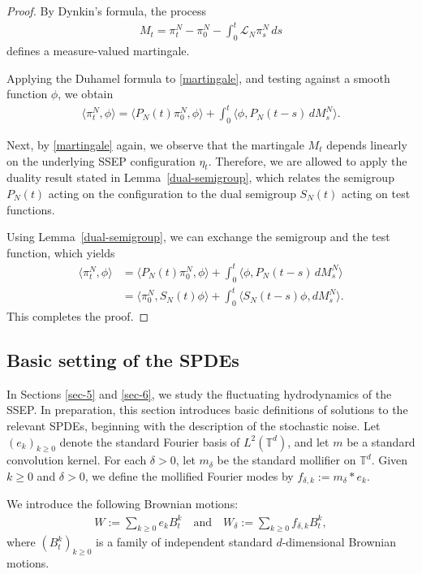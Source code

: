 \documentclass[UTF-8,reqno]{amsart}
\numberwithin{equation}{section}
\def\geq{\geqslant}
\def\geq{\geqslant}
\begin{document}
\begin{proof}
By Dynkin's formula, the process
\begin{align}\label{martingale}
M_t = \pi^N_t - \pi^N_0 - \int_0^t \mathcal{L}_N \pi^N_s \, ds
\end{align}
defines a measure-valued martingale.

Applying the Duhamel formula to \eqref{martingale}, and testing against a smooth function $\phi$, we obtain
\begin{align*}
\langle \pi^N_t, \phi \rangle 
= \langle P_N(t)\pi^N_0, \phi \rangle + \int_0^t \langle \phi, P_N(t-s) \, dM^N_s \rangle.
\end{align*}

Next, by \eqref{martingale} again, we observe that the martingale $M_t$ depends linearly on the underlying SSEP configuration $\eta_t$. Therefore, we are allowed to apply the duality result stated in Lemma~\ref{dual-semigroup}, which relates the semigroup $P_N(t)$ acting on the configuration to the dual semigroup $S_N(t)$ acting on test functions.

Using Lemma~\ref{dual-semigroup}, we can exchange the semigroup and the test function, which yields
\begin{align*}
\langle \pi^N_t, \phi \rangle 
&= \langle P_N(t)\pi^N_0, \phi \rangle + \int_0^t \langle \phi, P_N(t-s) \, dM^N_s \rangle \\
&= \langle \pi^N_0, S_N(t)\phi \rangle + \int_0^t \langle S_N(t-s)\phi, dM^N_s \rangle.
\end{align*}
This completes the proof.
\end{proof}




\subsection{Basic setting of the SPDEs}
In Sections \ref{sec-5} and \ref{sec-6}, we study the fluctuating hydrodynamics of the SSEP. In preparation, this section introduces basic definitions of solutions to the relevant SPDEs, beginning with the description of the stochastic noise. Let $(e_k)_{k \geq 0}$ denote the standard Fourier basis of $L^2(\mathbb{T}^d)$, and let $m$ be a standard convolution kernel. For each $\delta > 0$, let $m_{\delta}$ be the standard mollifier on $\mathbb{T}^d$. Given $k \geq 0$ and $\delta > 0$, we define the mollified Fourier modes by $f_{\delta,k} := m_{\delta} \ast e_k$. 

We introduce the following Brownian motions:
\begin{align}\label{brownian}
W := \sum_{k \geq 0} e_k B_t^k \quad \text{and} \quad W_{\delta} := \sum_{k \geq 0} f_{\delta,k} B_t^k,
\end{align}
where $(B_t^k)_{k \geq 0}$ is a family of independent standard $d$-dimensional Brownian motions.
\end{document}
